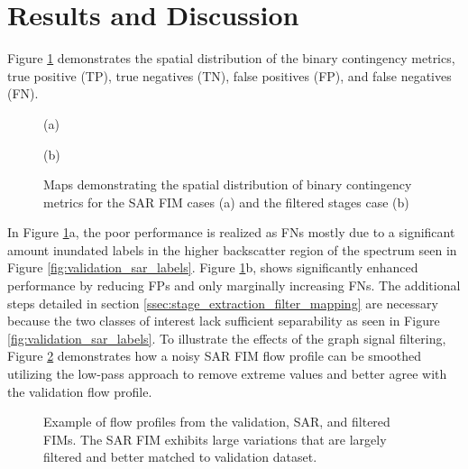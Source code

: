 \documentclass{article}
\begin{document}
\section{Results and Discussion}
\label{sec:results_and_discussion}
%
Figure \ref{fig:contingency_maps} demonstrates the spatial distribution of the binary contingency metrics, true positive (TP), true negatives (TN), false positives (FP), and false negatives (FN).
% 
\begin{figure}[htb]
    \begin{minipage}[b]{.48\linewidth}
        \centering
        \centerline{}
        \centerline{(a)}\medskip
    \end{minipage}
    \hfill
    \begin{minipage}[b]{0.48\linewidth}
        \centering
        \centerline{}
        \centerline{(b)}\medskip
    \end{minipage}
    \caption{Maps demonstrating the spatial distribution of binary contingency metrics for the SAR FIM cases (a) and the filtered stages case (b)}
    \label{fig:contingency_maps}
\end{figure}
%
In Figure \ref{fig:contingency_maps}a, the poor performance is realized as FNs mostly due to a significant amount inundated labels in the higher backscatter region of the spectrum seen in Figure \ref{fig:validation_sar_labels}.
Figure \ref{fig:contingency_maps}b, shows significantly enhanced performance by reducing FPs and only marginally increasing FNs.
The additional steps detailed in section \ref{ssec:stage_extraction_filter_mapping} are necessary because the two classes of interest lack sufficient separability as seen in Figure \ref{fig:validation_sar_labels}.
To illustrate the effects of the graph signal filtering, Figure \ref{fig:flow_profile} demonstrates how a noisy SAR FIM flow profile can be smoothed utilizing the low-pass approach to remove extreme values and better agree with the validation flow profile.
%
\begin{figure}[htb]
    \begin{minipage}[b]{1.0\linewidth}
        \centering
        \centerline{}
    \end{minipage}
    \caption{Example of flow profiles from the validation, SAR, and filtered FIMs. The SAR FIM exhibits large variations that are largely filtered and better matched to validation dataset.}
    \label{fig:flow_profile}
\end{figure}
\end{document}
